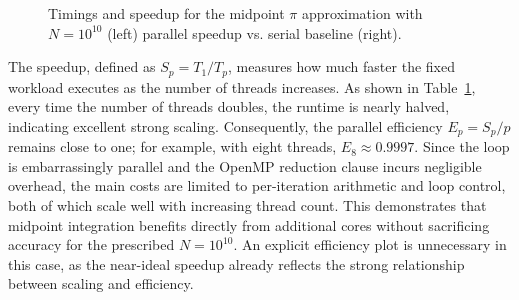 \begin{figure}[H]
    \hfill
    \vspace{2em}
    \caption{Timings and speedup for the midpoint $\pi$ approximation with $N = 10^{10}$ (left) parallel speedup vs. serial baseline (right).}
    \label{fig:pi_speedup}
\end{figure}

The speedup, defined as $S_p = T_1/T_p$, measures how much faster the fixed workload executes as the number of threads increases. As shown in Table~\ref{fig:pi_speedup}, every time the number of threads doubles, the runtime is nearly halved, indicating excellent strong scaling. Consequently, the parallel efficiency $E_p = S_p/p$ remains close to one; for example, with eight threads, $E_8 \approx 0.9997$. Since the loop is embarrassingly parallel and the OpenMP reduction clause incurs negligible overhead, the main costs are limited to per-iteration arithmetic and loop control, both of which scale well with increasing thread count. This demonstrates that midpoint integration benefits directly from additional cores without sacrificing accuracy for the prescribed $N = 10^{10}$. An explicit efficiency plot is unnecessary in this case, as the near-ideal speedup already reflects the strong relationship between scaling and efficiency.
